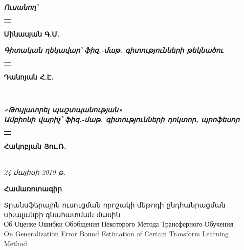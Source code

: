 \documentclass[12pt]{article}
\newcommand{\undertextline}[2]{ {
\renewcommand{\arraystretch}{0.7}
\begin{tabular}{p{#2cm}}
\\
\hline
\centering{{\fontsize{8pt}{8pt} \textit{#1}}}
\end{tabular}} }
\begin{document}
{


{\fontsize{13pt}{13pt} \selectfont \textit{\textbf{Ուսանող՝}}}
 \hspace{0.3cm} \undertextline{ստորագրություն}{7} \hspace{0.3cm}  {\fontsize{13pt}{13pt} \selectfont \textbf{Մինասյան Գ.Մ.}}\\
 
\vspace{5mm}

{\fontsize{13pt}{13pt} \selectfont \textit{\textbf{Գիտական ղեկավար՝  \hspace{0.3cm}ֆիզ.-մաթ. գիտությունների թեկնածու}}}\\


\large{\hspace{4cm} \undertextline{ստորագրություն}{7} \hspace{0.3cm} \hspace{0.3cm}  {\fontsize{13pt}{13pt} \selectfont \textbf{Դանոյան Հ.Է.}}}\\


\vspace{30mm}


{\fontsize{13pt}{13pt} \selectfont \textit{\textbf{«Թույլատրել պաշտպանության»}}}\\

{\fontsize{13pt}{13pt} \selectfont \textit{\textbf{Ամբիոնի վարիչ՝   \hspace{0.3cm}ֆիզ.-մաթ. գիտությունների դոկտոր, պրոֆեսոր}}}\\

\large{\hspace{3.5cm}  \undertextline{ստորագրություն}{7} \hspace{0.3cm} {\fontsize{13pt}{13pt} \selectfont \textbf{Հակոբյան Յու.Ռ.}}  } \\

{\fontsize{13pt}{13pt} \selectfont \textit{{24 մայիսի 2019 թ.}}}
}
\thispagestyle{empty}
\pagebreak






\begin{center}
\Large{\textbf{Համառոտագիր}}
 \end{center}
 \vspace{10mm}
{
\small Տրանսֆերային ուսուցման որոշակի մեթոդի ընդհանրացման սխալանքի գնահատման մասին\\
Об Оценке Ошибки Обобщения Некоторого Метода Трансферного Обучения \\
On Generalization Error Bound Estimation of Certain Transform Learning Method\\
}
\end{document}

